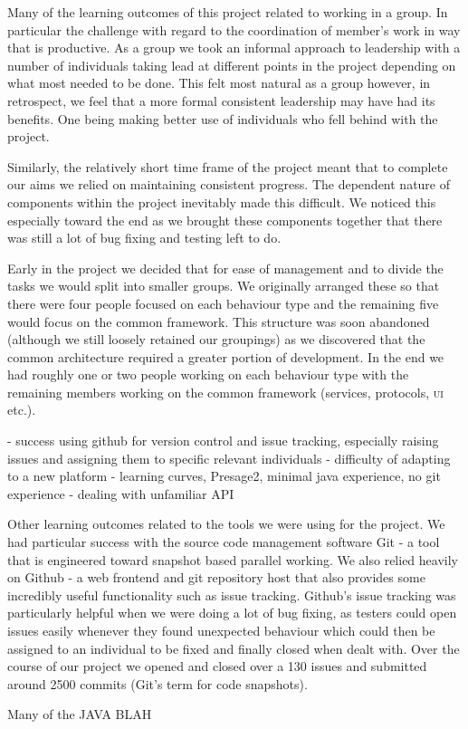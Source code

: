 Many of the learning outcomes of this project related to working in a group. In particular the challenge with regard to the coordination of member's work in way that is productive. As a group we took an informal approach to leadership with a number of individuals taking lead at different points in the project depending on what most needed to be done. This felt most natural as a group however, in retrospect, we feel that a more formal consistent leadership may have had its benefits. One being making better use of individuals who fell behind with the project.

Similarly, the relatively short time frame of the project meant that to complete our aims we relied on maintaining consistent progress. The dependent nature of components within the project inevitably made this difficult. We noticed this especially toward the end as we brought these components together that there was still a lot of bug fixing and testing left to do.

Early in the project we decided that for ease of management and to divide the tasks we would split into smaller groups. We originally arranged these so that there were four people focused on each behaviour type and the remaining five would focus on the common framework. This structure was soon abandoned (although we still loosely retained our groupings) as we discovered that the common architecture required a greater portion of development. In the end we had roughly one or two people working on each behaviour type with the remaining members working on the common framework (services, protocols, \textsc{ui} etc.). 

- success using github for version control and issue tracking, especially raising issues and assigning them to specific relevant individuals
- difficulty of adapting to a new platform - learning curves, Presage2, minimal java experience, no git experience
- dealing with unfamiliar API

Other learning outcomes related to the tools we were using for the project. We had particular success with the source code management software Git - a tool that is engineered toward snapshot based parallel working. We also relied heavily on Github - a web frontend and git repository host that also provides some incredibly useful functionality such as issue tracking. Github's issue tracking was particularly helpful when we were doing a lot of bug fixing, as testers could open issues easily whenever they found unexpected behaviour which could then be assigned to an individual to be fixed and finally closed when dealt with. Over the course of our project we opened and closed over a 130 issues and submitted around 2500 commits (Git's term for code snapshots).

Many of the JAVA BLAH
